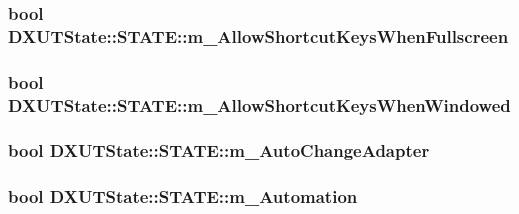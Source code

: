 \hypertarget{struct_d_x_u_t_state_1_1_s_t_a_t_e_ae9bf869e6bde0ba638b5385fa64f73c3}{
\subsubsection[{m\_\-AllowShortcutKeysWhenFullscreen}]{\setlength{\rightskip}{0pt plus 5cm}bool {\bf DXUTState::STATE::m\_\-AllowShortcutKeysWhenFullscreen}}}
\label{struct_d_x_u_t_state_1_1_s_t_a_t_e_ae9bf869e6bde0ba638b5385fa64f73c3}
\hypertarget{struct_d_x_u_t_state_1_1_s_t_a_t_e_a66398b1940d823c10e541198ab7bb60c}{
\subsubsection[{m\_\-AllowShortcutKeysWhenWindowed}]{\setlength{\rightskip}{0pt plus 5cm}bool {\bf DXUTState::STATE::m\_\-AllowShortcutKeysWhenWindowed}}}
\label{struct_d_x_u_t_state_1_1_s_t_a_t_e_a66398b1940d823c10e541198ab7bb60c}
\hypertarget{struct_d_x_u_t_state_1_1_s_t_a_t_e_a617e6fad467d4ccb7963c19e9d537bc0}{
\subsubsection[{m\_\-AutoChangeAdapter}]{\setlength{\rightskip}{0pt plus 5cm}bool {\bf DXUTState::STATE::m\_\-AutoChangeAdapter}}}
\label{struct_d_x_u_t_state_1_1_s_t_a_t_e_a617e6fad467d4ccb7963c19e9d537bc0}
\hypertarget{struct_d_x_u_t_state_1_1_s_t_a_t_e_a7f0689204ca27a9a3ef94a4713eebbd5}{
\subsubsection[{m\_\-Automation}]{\setlength{\rightskip}{0pt plus 5cm}bool {\bf DXUTState::STATE::m\_\-Automation}}}
\label{struct_d_x_u_t_state_1_1_s_t_a_t_e_a7f0689204ca27a9a3ef94a4713eebbd5}
